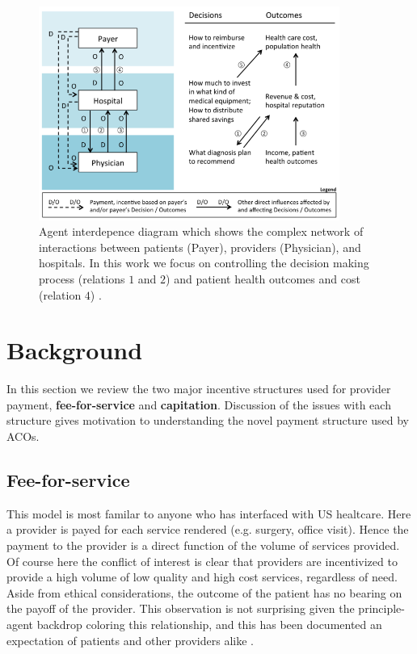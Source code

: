 \documentclass{article}
\begin{document}
\begin{figure}[H]
\includegraphics[height=7cm]{agentdep}
\centering
\caption{Agent interdepence diagram which shows the complex network of interactions between patients (Payer), providers (Physician), and hospitals. In this work we focus on controlling the decision making process (relations $1$ and $2$) and patient health outcomes and cost (relation $4$) \cite{msdt}.}
\label{fig:agentdep}
\end{figure}

\section*{Background}
In this section we review the two major incentive structures used for provider payment, \textbf{fee-for-service} and \textbf{capitation}. Discussion of the issues with each structure gives motivation to understanding the novel payment structure used by ACOs.

\subsection*{Fee-for-service}
This model is most familar to anyone who has interfaced with US healtcare. Here a provider is payed for each service rendered (e.g. surgery, office visit). Hence the payment to the provider is a direct function of the volume of services provided. Of course here the conflict of interest is clear that providers are incentivized to provide a high volume of low quality and high cost services, regardless of need. Aside from ethical considerations, the outcome of the patient has no bearing on the payoff of the provider. This observation is not surprising given the principle-agent backdrop coloring this relationship, and this has been documented an expectation of patients and other providers alike \cite{econharvard}\cite{overtreat}.
\end{document}
